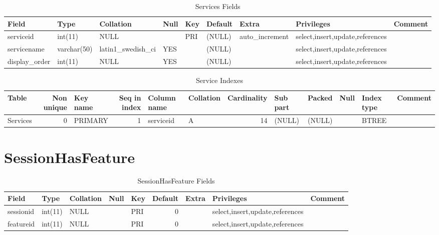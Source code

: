 \documentclass[captions=tablesignature]{scrartcl}
\begin{document}
\begin{table}[htb]
\caption{\label{tbl:servicesfields}Services Fields}
\centering
\begin{tabular}{lllllllll}
\hline
Field & Type & Collation & Null & Key & Default & Extra & Privileges & Comment\\
\hline
serviceid & int(11) & NULL &  & PRI & (NULL) & auto\_increment & select,insert,update,references & \\
servicename & varchar(50) & latin1\_swedish\_ci & YES &  & (NULL) &  & select,insert,update,references & \\
display\_order & int(11) & NULL & YES &  & (NULL) &  & select,insert,update,references & \\
\hline
\end{tabular}
\end{table}

\begin{table}[htb]
\caption{\label{tbl:serviceindexes}Service Indexes}
\centering
\begin{tabular}{lrlrllrlllll}
\hline
Table & Non unique & Key name & Seq in index & Column name & Collation & Cardinality & Sub part & Packed & Null & Index type & Comment\\
\hline
Services & 0 & PRIMARY & 1 & serviceid & A & 14 & (NULL) & (NULL) &  & BTREE & \\
\hline
\end{tabular}
\end{table}
\section{SessionHasFeature}
\label{sec-26}

\begin{table}[htb]
\caption{\label{tbl:sessionhasfeaturefields}SessionHasFeature Fields}
\centering
\begin{tabular}{lllllrlll}
\hline
Field & Type & Collation & Null & Key & Default & Extra & Privileges & Comment\\
\hline
sessionid & int(11) & NULL &  & PRI & 0 &  & select,insert,update,references & \\
featureid & int(11) & NULL &  & PRI & 0 &  & select,insert,update,references & \\
\hline
\end{tabular}
\end{table}
\end{document}
